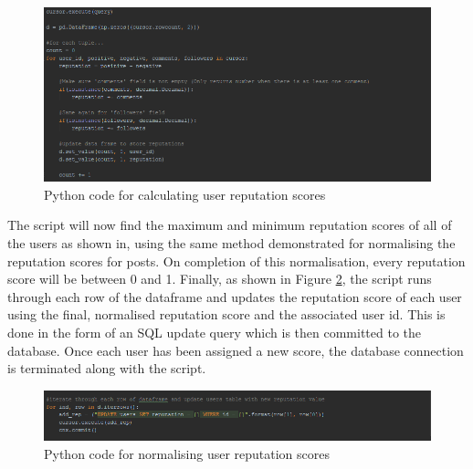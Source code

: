 \begin{figure}[H]
\centering
\includegraphics[width=\linewidth]{Images/Implementation/UserRepPython1}
\caption{Python code for calculating user reputation scores}
\label{fig:UserRepPython1}
\end{figure}

The script will now find the maximum and minimum reputation scores of all of the users as shown in, using the same method demonstrated for normalising the reputation scores for posts. On completion of this normalisation, every reputation score will be between 0 and 1. Finally, as shown in Figure \ref{fig:UserRepPython2}, the script runs through each row of the dataframe and updates the reputation score of each user using the final, normalised reputation score and the associated user id. This is done in the form of an SQL update query which is then committed to the database. Once each user has been assigned a new score, the database connection is terminated along with the script.

\begin{figure}[H]
\centering
\includegraphics[width=\linewidth]{Images/Implementation/UserRepPython2}
\caption{Python code for normalising user reputation scores}
\label{fig:UserRepPython2}
\end{figure}